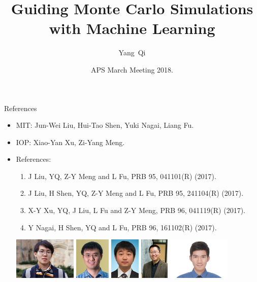 \documentclass[xcolor=table, 10pt, aspectratio=169]{beamer}
\title[SMLC] %
{Guiding Monte Carlo Simulations with Machine Learning}
\author[Y Qi] %
{Yang~Qi}
\institute[Fudan] %
{
  Department of Physics, Fudan University
}
\date{APS March Meeting 2018.}
\begin{document}
\begin{frame}
  \titlepage
\end{frame}

\begin{frame}{References}
\begin{itemize}
\item MIT: Jun-Wei Liu, Hui-Tao Shen, Yuki Nagai, Liang Fu.
\item IOP: Xiao-Yan Xu, Zi-Yang Meng.
\item References:
\begin{enumerate}
  \item J Liu, YQ, Z-Y Meng and L Fu, PRB 95, 041101(R) (2017).
  \item J Liu, H Shen, YQ, Z-Y Meng and L Fu, PRB 95, 241104(R) (2017).
  \item X-Y Xu, YQ, J Liu, L Fu and Z-Y Meng, PRB 96, 041119(R) (2017).
  \item Y Nagai, H Shen, YQ and L Fu, PRB 96, 161102(R) (2017).
\end{enumerate}
\begin{center}
	\includegraphics[height=2cm]{../people/huitaoshen}
	\includegraphics[height=2cm]{../people/junweiliu}
	\includegraphics[height=2cm]{../people/yuki}
	\includegraphics[height=2cm]{../people/liangfu}
	\includegraphics[height=2cm]{../people/xiaoyanxu}

\end{center}
\end{itemize}
\end{frame}
\end{document}
